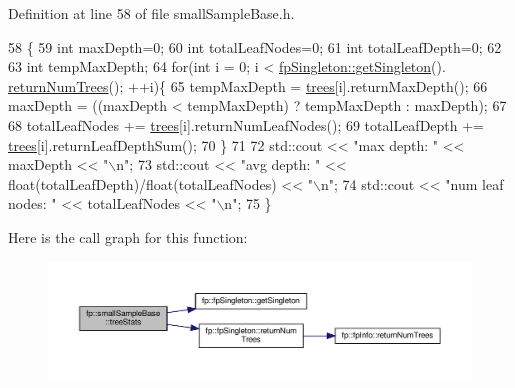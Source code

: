 Definition at line 58 of file small\+Sample\+Base.\+h.


\begin{DoxyCode}
58                             \{
59                 \textcolor{keywordtype}{int} maxDepth=0;
60                 \textcolor{keywordtype}{int} totalLeafNodes=0;
61                 \textcolor{keywordtype}{int} totalLeafDepth=0;
62 
63                 \textcolor{keywordtype}{int} tempMaxDepth;
64                 \textcolor{keywordflow}{for}(\textcolor{keywordtype}{int} i = 0; i < \hyperlink{classfp_1_1fpSingleton_a8bdae77b68521003e3fc630edec2e240}{fpSingleton::getSingleton}().
      \hyperlink{classfp_1_1fpSingleton_a8be36616345b6b77ce4c60b99cc2b91c}{returnNumTrees}(); ++i)\{
65                     tempMaxDepth = \hyperlink{classfp_1_1smallSampleBase_a9a3d92948248f1809d9f025b553512b6}{trees}[i].returnMaxDepth();
66                     maxDepth = ((maxDepth < tempMaxDepth) ? tempMaxDepth : maxDepth);
67 
68                     totalLeafNodes += \hyperlink{classfp_1_1smallSampleBase_a9a3d92948248f1809d9f025b553512b6}{trees}[i].returnNumLeafNodes();
69                     totalLeafDepth += \hyperlink{classfp_1_1smallSampleBase_a9a3d92948248f1809d9f025b553512b6}{trees}[i].returnLeafDepthSum();
70                 \}
71 
72                 std::cout << \textcolor{stringliteral}{"max depth: "} << maxDepth << \textcolor{stringliteral}{"\(\backslash\)n"};
73                 std::cout << \textcolor{stringliteral}{"avg depth: "} << float(totalLeafDepth)/float(totalLeafNodes) << \textcolor{stringliteral}{"\(\backslash\)n"};
74                 std::cout << \textcolor{stringliteral}{"num leaf nodes: "} << totalLeafNodes << \textcolor{stringliteral}{"\(\backslash\)n"};
75             \}
\end{DoxyCode}
Here is the call graph for this function\+:
\nopagebreak
\begin{figure}[H]
\begin{center}
\leavevmode
\includegraphics[width=350pt]{classfp_1_1smallSampleBase_acc948b260715a190675a5d5ebedf0429_cgraph}
\end{center}
\end{figure}


